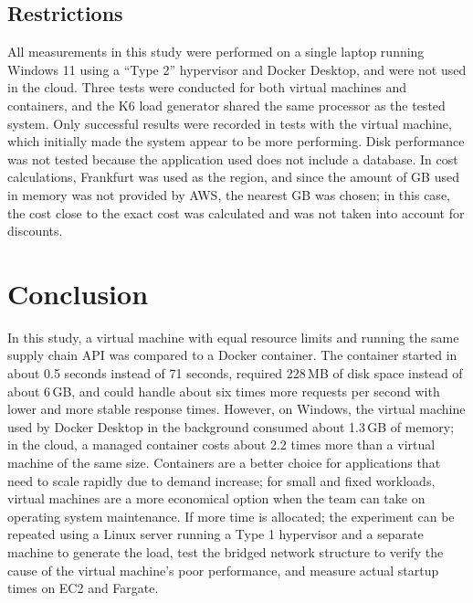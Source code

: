 \documentclass[conference,a4paper]{IEEEtran}
\begin{document}
\subsection{Restrictions}
All measurements in this study were performed on a single laptop running Windows 11 using a ``Type 2'' hypervisor and Docker Desktop, and were not used in the cloud. Three tests were conducted for both virtual machines and containers, and the K6 load generator shared the same processor as the tested system. Only successful results were recorded in tests with the virtual machine, which initially made the system appear to be more performing. Disk performance was not tested because the application used does not include a database. In cost calculations, Frankfurt was used as the region, and since the amount of GB used in memory was not provided by AWS, the nearest GB was chosen; in this case, the cost close to the exact cost was calculated and was not taken into account for discounts.

\section{Conclusion}
\label{sec:conclusion}

In this study, a virtual machine with equal resource limits and running the same supply chain API was compared to a Docker container. The container started in about 0.5 seconds instead of 71 seconds, required 228\,MB of disk space instead of about 6\,GB, and could handle about six times more requests per second with lower and more stable response times. However, on Windows, the virtual machine used by Docker Desktop in the background consumed about 1.3\,GB of memory; in the cloud, a managed container costs about 2.2 times more than a virtual machine of the same size. Containers are a better choice for applications that need to scale rapidly due to demand increase; for small and fixed workloads, virtual machines are a more economical option when the team can take on operating system maintenance. If more time is allocated; the experiment can be repeated using a Linux server running a Type 1 hypervisor and a separate machine to generate the load, test the bridged network structure to verify the cause of the virtual machine's poor performance, and measure actual startup times on EC2 and Fargate.

\end{document}

